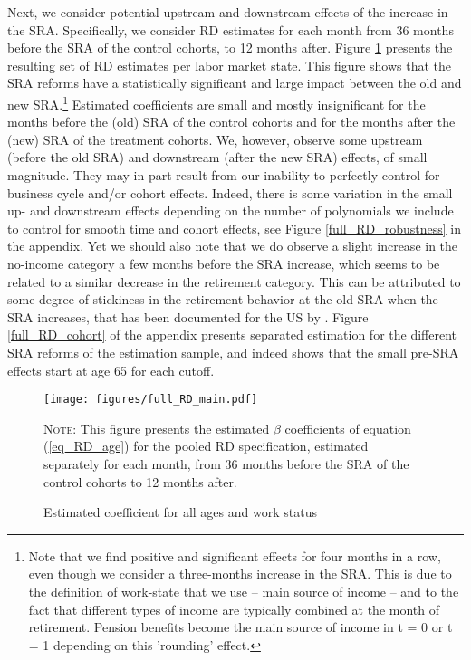 \documentclass[12pt,a4paper]{article}
\begin{document}
Next, we consider potential upstream and downstream effects of the increase in the SRA. Specifically, we consider RD estimates for each month from 36 months before the SRA of the control cohorts, to 12 months after. Figure \ref{full_RD_main} presents the resulting set of RD estimates per labor market state. This figure shows that the SRA reforms have a statistically significant and large impact between the old and new SRA.\footnote{Note that we find positive and significant effects for four months in a row, even though we consider a three-months increase in the SRA. This is due to the definition of work-state that we use -- main source of income -- and to the fact that different types of income are typically combined at the month of retirement. Pension benefits become the main source of income in t = 0 or t = 1 depending on this 'rounding' effect.} Estimated coefficients are small and mostly insignificant for the months before the (old) SRA of the control cohorts and for the months after the (new) SRA of the treatment cohorts.
We, however, observe some upstream (before the old SRA) and downstream (after the new SRA) effects, of small magnitude. They may in part result from our inability to perfectly control for business cycle and/or cohort effects. Indeed, there is some variation in the small up- and downstream effects depending on the number of polynomials we include to control for smooth time and cohort effects, see Figure \ref{full_RD_robustness} in the appendix. Yet we should also note that we do observe a slight increase in the no-income category a few months before the SRA increase, which seems to be related to a similar decrease in the retirement category. This can be attributed to some degree of stickiness in the retirement behavior at the old SRA when the SRA increases, that has been documented for the US by \cite{deshpande2020sticky}. Figure \ref{full_RD_cohort} of the appendix presents separated estimation for the different SRA reforms of the estimation sample, and indeed shows that the small pre-SRA effects start at age 65 for each cutoff.   %


\begin{figure}[!t]
\begin{adjustwidth}{-1in}{-1in}	
\caption{Estimated coefficient for all ages and work status}
\label{full_RD_main}
\centering
\texttt{[image: figures/full\_RD\_main.pdf]}
\end{adjustwidth}
\begin{minipage}{14cm}%
\scriptsize
\textsc{Note:} This figure presents the estimated $\beta$ coefficients of equation (\ref{eq_RD_age}) for the pooled RD specification, estimated separately for each month, from 36 months before the SRA of the control cohorts to 12 months after. 
\end{minipage}%
\end{figure}
\end{document}

